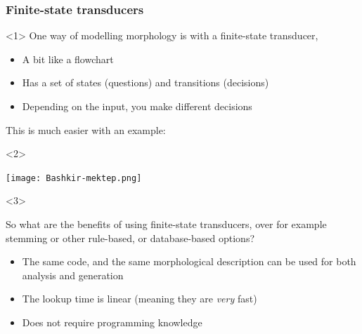 \documentclass[10pt,xetex]{beamer} %
\begin{document}
\begin{frame}
  \frametitle{Finite-state transducers}

\begin{onlyenv}<1>
One way of modelling morphology is with a finite-state transducer,


\begin{itemize}
  \item A bit like a flowchart
  \item Has a set of states (questions) and transitions (decisions)
  \item Depending on the input, you make different decisions
\end{itemize}

This is much easier with an example:
\end{onlyenv}

\begin{onlyenv}<2>

\texttt{[image: Bashkir-mektep.png]}

\end{onlyenv}

\begin{onlyenv}<3>

So what are the benefits of using finite-state transducers, over for example
stemming or other rule-based, or database-based options?

\begin{itemize}
  \item The same code, and the same morphological description can be used for both analysis and generation
  \item The lookup time is linear (meaning they are {\em very} fast)
  \item Does not require programming knowledge
\end{itemize}

\end{onlyenv}




\end{frame}
\end{document}
